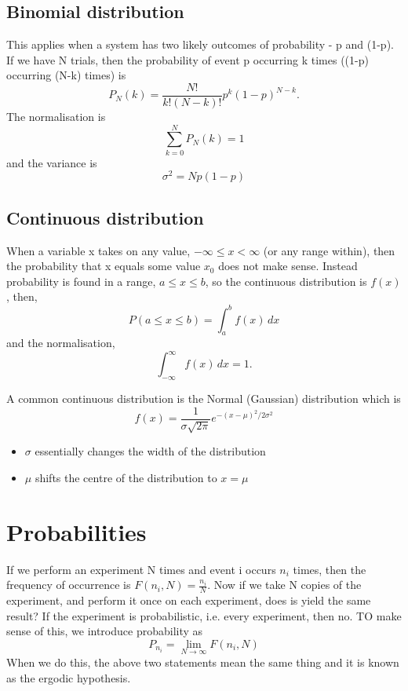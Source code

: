 \documentclass[a4paper, 11pt, normalem]{report}
\begin{document}
\subsection{Binomial distribution}
This applies when a system has two likely outcomes of probability - p and (1-p).
If we have N trials, then the probability of event p occurring k times ((1-p) occurring (N-k) times) is
\begin{equation}
    P_N(k) = \frac{N!}{k!(N-k)!}p^k(1-p)^{N-k}.
\end{equation}
The normalisation is
\begin{equation}
    \sum_{k=0}^{N} P_N(k) = 1
\end{equation}
and the variance is
\begin{equation}
    \sigma^2 = Np(1-p)
\end{equation}

\subsection{Continuous distribution}
When a variable x takes on any value, $-\infty\leq x <\infty$ (or any range within), then the probability that x equals some value $x_0$ does not make sense.
Instead probability is found in a range, $a\leq x\leq b$, so the continuous distribution is $f(x)$, then,
\begin{equation}
    P(a\leq x\leq b) = \int_{a}^{b} f(x)\,dx
\end{equation}
and the normalisation,
\begin{equation}
    \int_{-\infty}^{\infty} f(x)\,dx = 1.
\end{equation}

A common continuous distribution is the Normal (Gaussian) distribution which is
\begin{equation}
    f(x) = \frac{1}{\sigma\sqrt{2\pi}}e^{-(x-\mu)^2/2\sigma^2}
\end{equation}
\begin{itemize}
    \item $\sigma$ essentially changes the width of the distribution
    \item $\mu$ shifts the centre of the distribution to $x=\mu$
\end{itemize}

\section{Probabilities}
If we perform an experiment N times and event i occurs $n_i$ times, then the frequency of occurrence is $F(n_i, N) = \frac{n_i}{N}$.
Now if we take N copies of the experiment, and perform it once on each experiment, does is yield the same result?
If the experiment is probabilistic, i.e. every experiment, then no.
TO make sense of this, we introduce probability as
\begin{equation}
    P_{n_i} = \lim_{N\to\infty} F(n_i, N)
\end{equation}
When we do this, the above two statements mean the same thing and it is known as the ergodic hypothesis.
\end{document}
